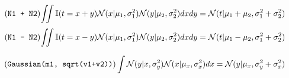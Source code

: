 \documentclass[article]{jss}
\newif\ifen
\newif\ifes
\newcommand{\en}[1]{\ifen#1\fi}
\newcommand{\es}[1]{\ifes#1\fi}
\newcommand{\N}{\mathcal{N}}
\begin{document}
%
\vspace{-0.3cm}
%
\begin{equation} \tag{\texttt{N1 + N2}} \label{eq:suma_normales}
\begin{split}
\iint \mathbb{I}(t = x + y) \N(x|\mu_1, \sigma_1^2)\N(y|\mu_2, \sigma_2^2) dxdy = \N(t|\mu_1+\mu_2,\sigma_1^2 + \sigma_2^2)
\end{split}
\end{equation}
%
\vspace{-0.5cm}
%
\begin{equation} \tag{\texttt{N1 - N2}} \label{eq:resta_normales}
\begin{split}
\iint \mathbb{I}(t = x - y) \N(x|\mu_1, \sigma_1^2)\N(y|\mu_2, \sigma_2^2) dxdy = \N(t|\mu_1 - \mu_2,\sigma_1^2 + \sigma_2^2)
\end{split}
\end{equation}
%
\en{For its part, the following property will be computed ``by hand''.}
\es{Por su parte, la siguiente propiedad la computaremos ``a mano''.}
%
\begin{equation} \label{eq:normal_de_normal} \tag{\texttt{Gaussian(m1, sqrt(v1+v2))}}
\int \N(y| x, \sigma_y^2) \N(x| \mu_x, \sigma_x^2) dx = \N(y|\mu_x,\sigma_y^2 + \sigma_x^2)   
\end{equation}
%
\en{Note that the value of \texttt{m1},\texttt{v1},\texttt{v2} has been previously defined.}
\es{Notar que el valor de \texttt{m1},\texttt{v1},\texttt{v2} a sido definido previamente.}


\subsection{\en{Graphical factorization}}\label{sec:2vs2}
\end{document}
